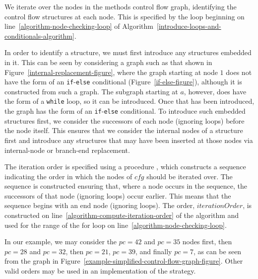 We iterate over the nodes in the methods control flow graph,
identifying the control flow structures at each node.
This is specified by the loop beginning on
line~\ref{algorithm-node-checking-loop} of
Algorithm~\ref{introduce-loops-and-conditionals-algorithm}.

In order to identify a structure, we must first introduce any
structures embedded in it.
This can be seen by considering a graph such as that shown in
Figure~\ref{internal-replacement-figure}, where the graph starting at
node $1$ does not have the form of an \texttt{if}-\texttt{else}
conditional (Figure~\ref{if-else-figure}), although it is constructed
from such a graph.
The subgraph starting at $a$, however, does have the form of a
\texttt{while} loop, so it can be introduced.
Once that has been introduced, the graph has the form of an
\texttt{if}-\texttt{else} conditional.
To introduce such embedded structures first, we consider the
successors of each node (ignoring loops) before the node itself.
This ensures that we consider the internal nodes of a structure first
and introduce any structures that may have been inserted at those
nodes via internal-node or branch-end replacement.

The iteration order is specified using a procedure
, which constructs a sequence indicating the
order in which the nodes of $cfg$ should be iterated over.
The sequence is constructed ensuring that, where a node occurs in the
sequence, the successors of that node (ignoring loops) occur earlier.
This means that the sequence begins with an end node (ignoring loops).
The order, $iterationOrder$, is constructed on
line~\ref{algorithm-compute-iteration-order} of the algorithm and used
for the range of the for loop on
line~\ref{algorithm-node-checking-loop}.

In our example, we may consider the $pc=42$ and $pc=35$ nodes first,
then $pc=28$ and $pc=32$, then $pc=21$, $pc=39$, and finally $pc=7$,
as can be seen from the graph in
Figure~\ref{example-simplified-control-flow-graph-figure}.
Other valid orders may be used in an implementation of the strategy.

